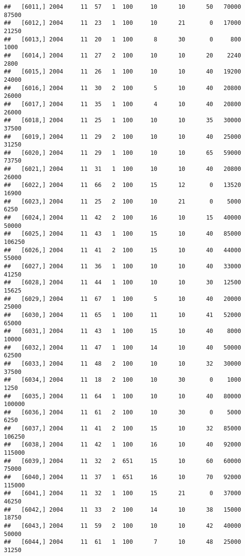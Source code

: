 \documentclass{article}\usepackage[]{graphicx}\usepackage[]{color}
\makeatletter
\newenvironment{kframe}{%
 \def\at@end@of@kframe{}%
 \ifinner\ifhmode%
  \def\at@end@of@kframe{\end{minipage}}%
  \begin{minipage}{\columnwidth}%
 \fi\fi%
 \def\FrameCommand##1{\hskip\@totalleftmargin \hskip-\fboxsep
 \colorbox{shadecolor}{##1}\hskip-\fboxsep
     \hskip-\linewidth \hskip-\@totalleftmargin \hskip\columnwidth}%
 \MakeFramed {\advance\hsize-\width
   \@totalleftmargin\z@ \linewidth\hsize
   \@setminipage}}%
 {\par\unskip\endMakeFramed%
 \at@end@of@kframe}
\newenvironment{knitrout}{}{} %
\makeatother
\begin{document}
\begin{knitrout}
\begin{kframe}
\begin{verbatim}
##   [6011,] 2004     11  57   1  100     10      10      50   70000   87500
##   [6012,] 2004     11  23   1  100     10      21       0   17000   21250
##   [6013,] 2004     11  20   1  100      8      30       0     800    1000
##   [6014,] 2004     11  27   2  100     10      10      20    2240    2800
##   [6015,] 2004     11  26   1  100     10      10      40   19200   24000
##   [6016,] 2004     11  30   2  100      5      10      40   20800   26000
##   [6017,] 2004     11  35   1  100      4      10      40   20800   26000
##   [6018,] 2004     11  25   1  100     10      10      35   30000   37500
##   [6019,] 2004     11  29   2  100     10      10      40   25000   31250
##   [6020,] 2004     11  29   1  100     10      10      65   59000   73750
##   [6021,] 2004     11  31   1  100     10      10      40   20800   26000
##   [6022,] 2004     11  66   2  100     15      12       0   13520   16900
##   [6023,] 2004     11  25   2  100     10      21       0    5000    6250
##   [6024,] 2004     11  42   2  100     16      10      15   40000   50000
##   [6025,] 2004     11  43   1  100     15      10      40   85000  106250
##   [6026,] 2004     11  41   2  100     15      10      40   44000   55000
##   [6027,] 2004     11  36   1  100     10      10      40   33000   41250
##   [6028,] 2004     11  44   1  100     10      10      30   12500   15625
##   [6029,] 2004     11  67   1  100      5      10      40   20000   25000
##   [6030,] 2004     11  65   1  100     11      10      41   52000   65000
##   [6031,] 2004     11  43   1  100     15      10      40    8000   10000
##   [6032,] 2004     11  47   1  100     14      10      40   50000   62500
##   [6033,] 2004     11  48   2  100     10      10      32   30000   37500
##   [6034,] 2004     11  18   2  100     10      30       0    1000    1250
##   [6035,] 2004     11  64   1  100     10      10      40   80000  100000
##   [6036,] 2004     11  61   2  100     10      30       0    5000    6250
##   [6037,] 2004     11  41   2  100     15      10      32   85000  106250
##   [6038,] 2004     11  42   1  100     16      10      40   92000  115000
##   [6039,] 2004     11  32   2  651     15      10      60   60000   75000
##   [6040,] 2004     11  37   1  651     16      10      70   92000  115000
##   [6041,] 2004     11  32   1  100     15      21       0   37000   46250
##   [6042,] 2004     11  33   2  100     14      10      38   15000   18750
##   [6043,] 2004     11  59   2  100     10      10      42   40000   50000
##   [6044,] 2004     11  61   1  100      7      10      48   25000   31250

\end{verbatim}
\end{kframe}
\end{knitrout}
\end{document}
